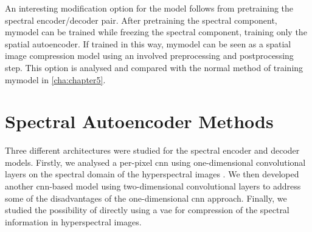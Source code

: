 An interesting modification option for the model follows from pretraining the spectral encoder/decoder pair. After pretraining the spectral component, \ac{mymodel} can be trained while freezing the spectral component, training only the spatial autoencoder. If trained in this way, \ac{mymodel} can be seen as a spatial image compression model using an involved preprocessing and postprocessing step. This option is analysed and compared with the normal method of training \ac{mymodel} in \autoref{cha:chapter5}.
\section{Spectral Autoencoder Methods}
Three different architectures were studied for the spectral encoder and decoder models. Firstly, we analysed a per-pixel \ac{cnn} using one-dimensional convolutional layers on the spectral domain of the hyperspectral images \citep{kuester_1d-convolutional_2021,kuester_transferability_2022}. We then developed another \ac{cnn}-based model using two-dimensional convolutional layers to address some of the disadvantages of the one-dimensional \ac{cnn} approach. Finally, we studied the possibility of directly using a \ac{vae} for compression of the spectral information in hyperspectral images. 
